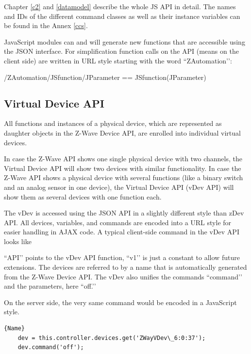 Chapter \ref{c2} and \ref{datamodel} describe the whole JS API in detail. The 
names and IDs of the different command classes as well as their instance variables 
can be found in the Annex \ref{ccs}.

JavaScript modules can and will generate new functions that are accessible using the 
JSON interface. For simplification function calls on the API (means on the client side) 
are written in URL style starting with the word ``ZAutomation’’:


\begin{center}
/ZAutomation/JSfunction/JParameter
== JSfunction(JParameter)
\end{center}

\subsection{Virtual Device API}

All functions and instances of a physical device, which are represented as daughter objects
in the Z-Wave Device API, are enrolled into individual virtual devices.

In case the Z-Wave API shows one single physical device with two channels, the Virtual 
Device API will show two devices with similar functionality. In case the Z-Wave API shows 
a physical device with several functions (like a binary switch and an analog sensor in 
one device), the Virtual Device API (vDev API) will show them as several devices with 
one function each.

The vDev is accessed using the JSON API in a slightly different style than zDev API. 
All devices, variables, and commands are encoded into a URL style for easier handling 
in AJAX code. A typical client-side command in the vDev API looks like




``API’’ points to the vDev API function, ``v1’’ is just a constant to allow future extensions. 
The devices are referred to by a name that is automatically generated from the Z-Wave Device 
API. The vDev also unifies the commands ``command’’ and the parameters, here ``off.’’

On the server side, the very same command would be encoded in a JavaScript style.

\begin{lstlisting}[caption=Bind a function]{Name}
	dev = this.controller.devices.get('ZWayVDev\_6:0:37');
	dev.command('off');
\end{lstlisting}

